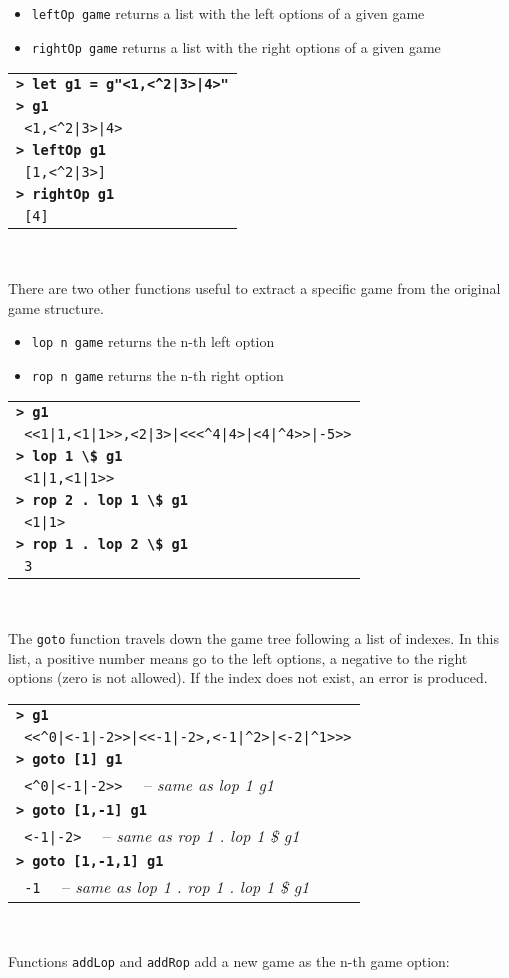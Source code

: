 \documentclass[a4paper,12pt]{article}
\newcommand{\bash}[1]{\small\textbf{\lstinline§> #1§}\\}
\newcommand{\out}[1]{\small\lstinline§ #1§}
\newcommand{\hsklcmt}[1]{~~-- \footnotesize\textit{#1}}
\newcommand{\haskellCode}{\fontfamily{pcr}\selectfont}
\newenvironment{sgcode}
	{ \haskellCode
	  \begin{tabular}{|p{0.9\textwidth}|}
      \hline	
	}
	{ \\\hline  
      \end{tabular} \\
	  \par 
	}
\begin{document}
\begin{itemize} \setlength\itemsep{0.1em}
  \item \verb|leftOp game| returns a list with the left options of a given game
  \item \verb|rightOp game| returns a list with the right options of a given game
\end{itemize}

\begin{sgcode}
\bash{let g1 = g"<1,<^2|3>|4>"}
\bash{g1}
\out{<1,<^2|3>|4>}\\
\bash{leftOp g1}
\out{[1,<^2|3>]} \\
\bash{rightOp g1}
\out{[4]}
\end{sgcode}

There are two other functions useful to extract a specific game from the original game structure.

\begin{itemize} \setlength\itemsep{0.1em}
  \item \verb|lop n game| returns the n-th left option
  \item \verb|rop n game| returns the n-th right option
\end{itemize}

\begin{sgcode}
\bash{g1}
\out{<<1|1,<1|1>>,<2|3>|<<<^4|4>|<4|^4>>|-5>>}\\
\bash{lop 1 \$ g1}
\out{<1|1,<1|1>>} \\
\bash{rop 2 . lop 1 \$ g1}
\out{<1|1>} \\
\bash{rop 1 . lop 2 \$ g1}
\out{3}
\end{sgcode}

The \verb|goto| function travels down the game tree following a list of indexes. In this list, a positive
number means go to the left options, a negative to the right options (zero is not allowed). If the index
does not exist, an error is produced.

\begin{sgcode}
\bash{g1}
\out{<<^0|<-1|-2>>|<<-1|-2>,<-1|^2>|<-2|^1>>>}\\
\bash{goto [1] g1}
\out{<^0|<-1|-2>>} \hsklcmt{same as lop 1 g1} \\
\bash{goto [1,-1] g1}
\out{<-1|-2>} \hsklcmt{same as rop 1 . lop 1 \$ g1} \\
\bash{goto [1,-1,1] g1}
\out{-1} \hsklcmt{same as lop 1 . rop 1 . lop 1 \$ g1}
\end{sgcode}

Functions \verb|addLop| and \verb|addRop| add a new game as the n-th game option:
\end{document}
